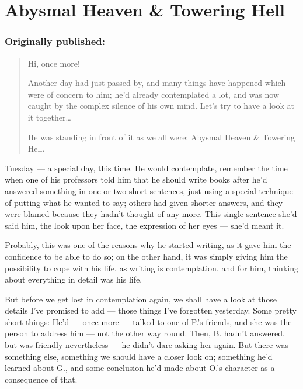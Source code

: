 \chapter{Abysmal Heaven \& Towering Hell}
\label{cha:abysmal-heaven-and-towering-hell}
\subsection*{Originally published: }
\begin{quote}
Hi, once more!

Another day had just passed by, and many things have happened which were of concern to him; he'd already contemplated a lot, and was now caught by the complex silence of his own mind. Let's try to have a look at it together\ldots

He was standing in front of it as we all were: Abysmal Heaven \& Towering Hell.
\end{quote}

Tuesday --- a special day, this time. 
He would contemplate, remember the time when one of his professors told him that he should write books after he'd answered something in one or two short sentences, just using a special technique of putting what he wanted to say; others had given shorter answers, and they were blamed because they hadn't thought of any more. This single sentence she'd said him, the look upon her face, the expression of her eyes --- she'd meant it.

Probably, this was one of the reasons why he started writing, as it gave him the confidence to be able to do so; on the other hand, it was simply giving him the possibility to cope with his life, as writing is contemplation, and for him, thinking about everything in detail was his life.

But before we get lost in contemplation again, we shall have a look at those details I've promised to add --- those things I've forgotten yesterday. Some pretty short things: He'd --- once more --- talked to one of P.'s friends, and she was the person to address him --- not the other way round. Then, B. hadn't answered, but was friendly nevertheless --- he didn't dare asking her again. But there was something else, something we should have a closer look on; something he'd learned about G., and some conclusion he'd made about O.'s character as a consequence of that.

